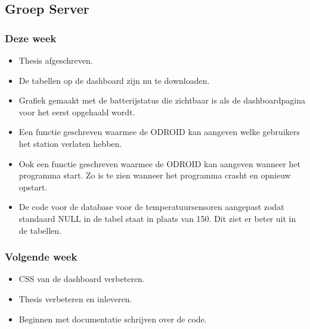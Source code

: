 \subsection*{Groep Server}
\subsubsection*{Deze week}
\begin{itemize}
\item Thesis afgeschreven.
\item De tabellen op de dashboard zijn nu te downloaden.
\item Grafiek gemaakt met de batterijstatus die zichtbaar is als de dashboardpagina voor het eerst opgehaald wordt.
\item Een functie geschreven waarmee de ODROID kan aangeven welke gebruikers het station verlaten hebben.
\item Ook een functie geschreven waarmee de ODROID kan aangeven wanneer het programma start. Zo is te zien wanneer het programma crasht en opnieuw opstart.
\item De code voor de database voor de temperatuursensoren aangepast zodat standaard NULL in de tabel staat in plaats van 150. Dit ziet er beter uit in de tabellen.
\end{itemize}
\subsubsection*{Volgende week}
\begin{itemize}
\item CSS van de dashboard verbeteren.
\item Thesis verbeteren en inleveren.
\item Beginnen met documentatie schrijven over de code.
\end{itemize}
